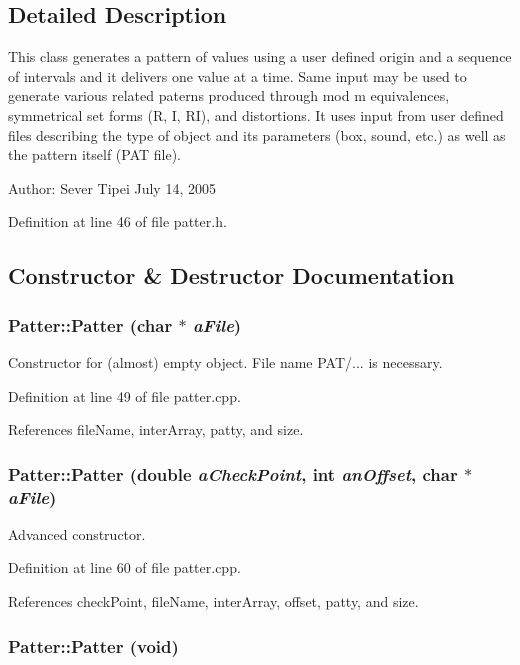 \subsection{Detailed Description}
This class generates a pattern of values using a user defined origin and a sequence of intervals and it delivers one value at a time. Same input may be used to generate various related paterns produced through mod m equivalences, symmetrical set forms (R, I, RI), and distortions. It uses input from user defined files describing the type of object and its parameters (box, sound, etc.) as well as the pattern itself (PAT file). \begin{Desc}
\item[Author:]Sever Tipei July 14, 2005 \end{Desc}




Definition at line 46 of file patter.h.

\subsection{Constructor \& Destructor Documentation}
\subsubsection{\setlength{\rightskip}{0pt plus 5cm}Patter::Patter (char $\ast$ {\em a\-File})}\label{classPatter_a0}


Constructor for (almost) empty object. File name PAT/... is necessary. 

Definition at line 49 of file patter.cpp.

References file\-Name, inter\-Array, patty, and size.
\subsubsection{\setlength{\rightskip}{0pt plus 5cm}Patter::Patter (double {\em a\-Check\-Point}, int {\em an\-Offset}, char $\ast$ {\em a\-File})}\label{classPatter_a1}


Advanced constructor. 

Definition at line 60 of file patter.cpp.

References check\-Point, file\-Name, inter\-Array, offset, patty, and size.
\subsubsection{\setlength{\rightskip}{0pt plus 5cm}Patter::Patter (void)}\label{classPatter_a2}


